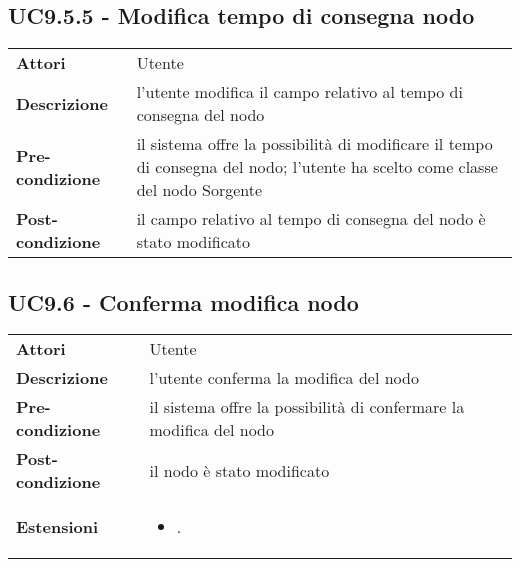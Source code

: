 \subsection{UC9.5.5 - Modifica tempo di consegna nodo}
\label{sssec:UC9.5.5}
\def\arraystretch{1.5}
\begin{tabularx}{\textwidth}{l|p{}}
\rowcolor{I} \multicolumn{2}{c}{\color{white}\textbf{UC9.5.5 - Modifica tempo di consegna nodo}} \\
\toprule
\endhead
\textbf{Attori} & Utente\\
\textbf{Descrizione} & l'utente modifica il campo relativo al  tempo di consegna del nodo\\
\textbf{Pre-condizione} & il sistema offre la possibilità di modificare il tempo di consegna del nodo; l'utente ha scelto come classe del nodo Sorgente\\
\textbf{Post-condizione} & il campo relativo al tempo di consegna del nodo è stato modificato\\
\bottomrule
\end{tabularx}
\subsection{UC9.6 - Conferma modifica nodo}
\label{sssec:UC9.6}
\def\arraystretch{1.5}
\begin{tabularx}{\textwidth}{l|p{}}
\rowcolor{I} \multicolumn{2}{c}{\color{white}\textbf{UC9.6 - Conferma modifica nodo}} \\
\toprule
\endhead
\textbf{Attori} & Utente\\
\textbf{Descrizione} & l'utente conferma la modifica del nodo\\
\textbf{Pre-condizione} & il sistema offre la possibilità di confermare la modifica del nodo\\
\textbf{Post-condizione} & il nodo è stato modificato\\
\textbf{Estensioni} & \vspace{-1.2em}\begin{itemize}[leftmargin=*,noitemsep,nosep]
\item \nameref{sssec:UC9.7}.
\end{itemize}\\
\bottomrule
\end{tabularx}
